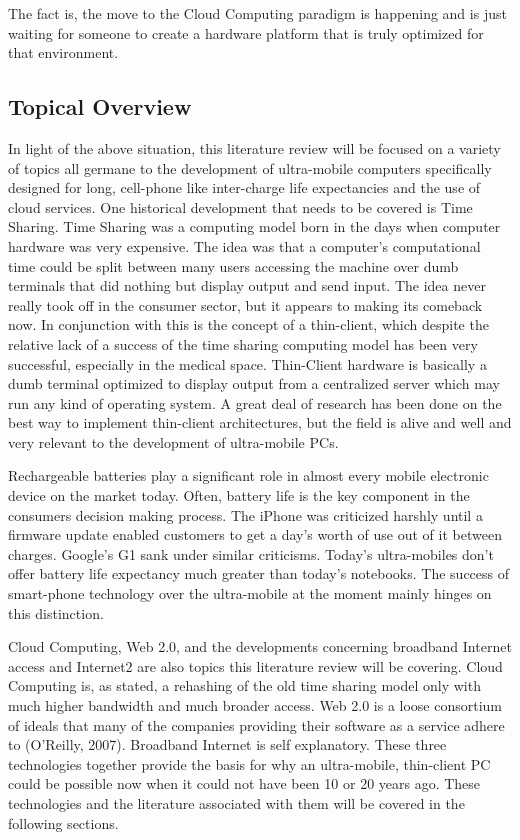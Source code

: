 \documentclass[12pt,oneside,letterpaper]{article}
\begin{document}
The fact is, the move to the Cloud Computing paradigm is happening and is just
waiting for someone to create a hardware platform that is truly optimized for
that environment.

\subsection{Topical Overview}

In light of the above situation, this literature review will be focused on a
variety of topics all germane to the development of ultra-mobile computers
specifically designed for long, cell-phone like inter-charge life expectancies
and the use of cloud services.  One historical development that needs to be
covered is Time Sharing.  Time Sharing was a computing model born in the days
when computer hardware was very expensive.  The idea was that a computer's
computational time could be split between many users accessing the machine over
dumb terminals that did nothing but display output and send input.  The idea
never really took off in the consumer sector, but it appears to making its
comeback now.  In conjunction with this is the concept of a thin-client, which
despite the relative lack of a success of the time sharing computing model has
been very successful, especially in the medical space.  Thin-Client hardware is
basically a dumb terminal optimized to display output from a centralized server
which may run any kind of operating system.  A great deal of research has been
done on the best way to implement thin-client architectures, but the field is
alive and well and very relevant to the development of ultra-mobile PCs.

Rechargeable batteries play a significant role in almost every mobile electronic
device on the market today.  Often, battery life is the key component in the
consumers decision making process.  The iPhone was criticized harshly until a
firmware update enabled customers to get a day's worth of use out of it between
charges.  Google's G1 sank under similar criticisms.  Today's ultra-mobiles
don't offer battery life expectancy much greater than today's notebooks.  The
success of smart-phone technology over the ultra-mobile at the moment mainly
hinges on this distinction.

Cloud Computing, Web 2.0, and the developments concerning broadband Internet
access and Internet2 are also topics this literature review will be covering.
Cloud Computing is, as stated, a rehashing of the old time sharing model only
with much higher bandwidth and much broader access.  Web 2.0 is a loose
consortium of ideals that many of the companies providing their software as a
service adhere to (O'Reilly, 2007).  Broadband Internet is self explanatory.
These three technologies together provide the basis for why an ultra-mobile,
thin-client PC could be possible now when it could not have been 10 or 20 years
ago.  These technologies and the literature associated with them will be covered
in the following sections.
\end{document}
